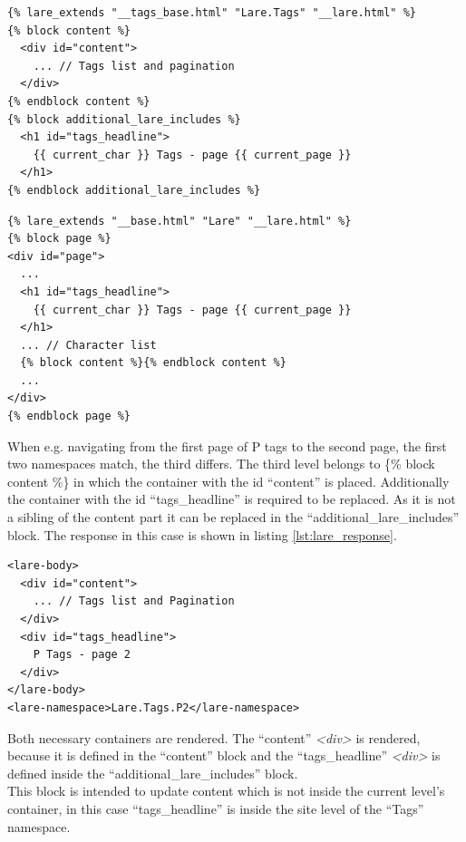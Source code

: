 \begin{minipage}[c]{0.95\linewidth}
\begin{lstlisting}[caption=tags.html, label=lst:tags_template]
{% lare_extends "__tags_base.html" "Lare.Tags" "__lare.html" %}
{% block content %}
  <div id="content">
    ... // Tags list and pagination
  </div>
{% endblock content %}
{% block additional_lare_includes %}
  <h1 id="tags_headline">
    {{ current_char }} Tags - page {{ current_page }}
  </h1>
{% endblock additional_lare_includes %}
\end{lstlisting}
\end{minipage}


\begin{minipage}[c]{0.95\linewidth}
\begin{lstlisting}[caption=\_\_tags\_base.html, label=lst:tags_base_template]
{% lare_extends "__base.html" "Lare" "__lare.html" %}
{% block page %}
<div id="page">
  ...
  <h1 id="tags_headline">
    {{ current_char }} Tags - page {{ current_page }}
  </h1>
  ... // Character list
  {% block content %}{% endblock content %}
  ...
</div>
{% endblock page %}
\end{lstlisting}
\end{minipage}

\noindent{}When e.g. navigating from the first page of P tags to the second page, the first two namespaces match, the third differs.
The third level belongs to \{\% block content \%\} in which the container with the id \enquote{content} is placed.
Additionally the container with the id \enquote{tags\_headline} is required to be replaced. As it is not a sibling of the content part it can be replaced in the \enquote{additional\_lare\_includes} block.
The response in this case is shown in listing \ref{lst:lare_response}.

\begin{minipage}[c]{0.95\linewidth}
\begin{lstlisting}[caption=Example Lare Response, label=lst:lare_response]
<lare-body>
  <div id="content">
    ... // Tags list and Pagination
  </div>
  <div id="tags_headline">
    P Tags - page 2
  </div>
</lare-body>
<lare-namespace>Lare.Tags.P2</lare-namespace>
\end{lstlisting}
\end{minipage}

\noindent{}Both necessary containers are rendered.
The \enquote{content} \emph{<div>} is rendered, because it is defined in the \enquote{content} block and the \enquote{tags\_headline} \emph{<div>} is defined inside the \enquote{additional\_lare\_includes} block.
\\
This block is intended to update content which is not inside the current level's container, in this case \enquote{tags\_headline} is inside the site level of the \enquote{Tags} namespace.
